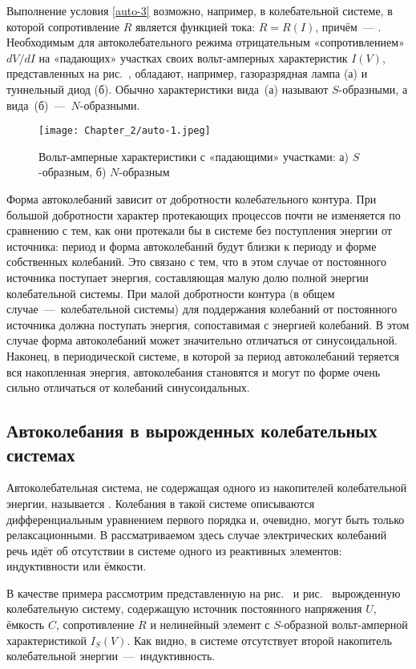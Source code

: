 Выполнение условия \eqref{auto-3} возможно, например, в 
колебательной системе, в которой сопротивление $R$ является функцией тока:
$R=R(I)$, причём~--- . Необходимым для
автоколебательного режима отрицательным «сопротивлением» ${dV}/{dI}$ на
«падающих» участках своих вольт-амперных характеристик $I(V)$, представленных на
рис.~, обладают, например, газоразрядная лампа (а) и туннельный
диод (б). Обычно характеристики вида~(а) называют $S$-образными, а
вида~(б)~---~$N$-образными.

\begin{figure}
	\centering
	\texttt{[image: Chapter\_2/auto-1.jpeg]}
	\caption{Вольт-амперные характеристики с «падающими» участками:	а)
$S$-образным, б) $N$-образным}
\end{figure}

Форма автоколебаний зависит от добротности колебательного контура. При большой
добротности характер протекающих процессов почти не изменяется по сравнению с
тем, как они протекали бы в системе без поступления
энергии от источника: период и форма автоколебаний будут близки к периоду и
форме собственных колебаний. Это связано с тем, что в этом случае от постоянного
источника поступает энергия, составляющая малую
долю полной энергии колебательной системы. При малой добротности контура (в
общем случае~---~колебательной системы) для поддержания колебаний от постоянного
источника должна поступать энергия, сопоставимая с энергией колебаний. В этом
случае форма автоколебаний может значительно отличаться от синусоидальной.
Наконец, в периодической системе, в которой за период автоколебаний теряется вся
накопленная энергия, автоколебания становятся  и
могут по форме очень сильно отличаться от колебаний синусоидальных.

\subsection{Автоколебания в вырожденных колебательных системах}
Автоколебательная система, не содержащая одного из накопителей колебательной
энергии, называется . Колебания в такой системе
описываются дифференциальным уравнением первого порядка и, очевидно, могут быть
только релаксационными. В рассматриваемом здесь случае электрических колебаний
речь идёт об отсутствии в системе одного из реактивных элементов: индуктивности
или ёмкости.

В качестве примера рассмотрим представленную на рис.~ и
рис.~ вырожденную колебательную систему, содержащую источник
постоянного напряжения $U$, ёмкость $C$, сопротивление $R$ и нелинейный элемент
с $S$-образной вольт-амперной характеристикой $I_S(V)$. Как видно, в системе
отсутствует второй накопитель колебательной энергии~---~индуктивность.

